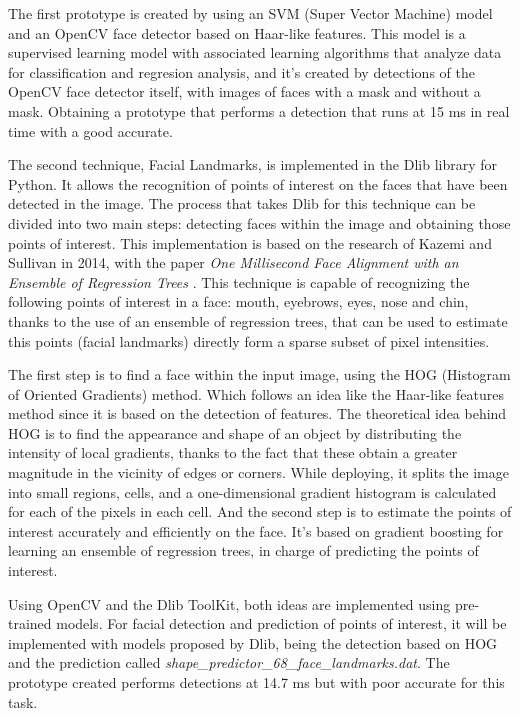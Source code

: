 The first prototype is created by using an SVM (Super Vector Machine) model and an OpenCV face detector based on Haar-like features. This model is a supervised learning model with associated learning algorithms that analyze data for classification and regresion analysis, and it's created by detections of the OpenCV face detector itself, with images of faces with a mask and without a mask. Obtaining a prototype that performs a detection that runs at 15 ms in real time with a good accurate.

The second technique, Facial Landmarks, is implemented in the Dlib library for Python. It allows the recognition of points of interest on the faces that have been detected in the image. The process that takes Dlib for this technique can be divided into two main steps: detecting faces within the image and obtaining those points of interest. This implementation is based on the research of Kazemi and Sullivan in 2014, with the paper \textit{One Millisecond Face Alignment with an Ensemble of Regression Trees} \cite{faceLandmark}. This technique is capable of recognizing the following points of interest in a face: mouth, eyebrows, eyes, nose and chin, thanks to the use of an ensemble of regression trees, that can be used to estimate this points (facial landmarks) directly form a sparse subset of pixel intensities.

The first step is to find a face within the input image, using the HOG (Histogram of Oriented Gradients) method. Which follows an idea like the Haar-like features method since it is based on the detection of features. The theoretical idea behind HOG is to find the appearance and shape of an object by distributing the intensity of local gradients, thanks to the fact that these obtain a greater magnitude in the vicinity of edges or corners. While deploying, it splits the image into small regions, cells, and a one-dimensional gradient histogram is calculated for each of the pixels in each cell. And the second step is to estimate the points of interest accurately and efficiently on the face. It's based on gradient boosting for learning an ensemble of regression trees, in charge of predicting the points of interest. 

Using OpenCV and the Dlib ToolKit, both ideas are implemented using pre-trained models. For facial detection and prediction of points of interest, it will be implemented with models proposed by Dlib, being the detection based on HOG and the prediction called \textit{shape\_predictor\_68\_face\_landmarks.dat}. The prototype created performs detections at 14.7 ms but with poor accurate for this task. 

